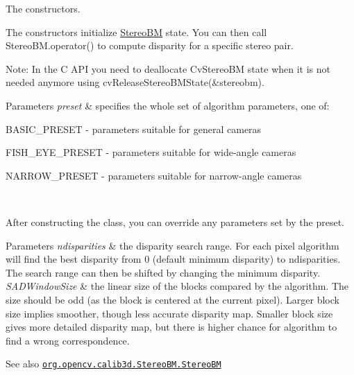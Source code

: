 The constructors.

The constructors initialize {\ttfamily \mbox{\hyperlink{classorg_1_1opencv_1_1calib3d_1_1_stereo_b_m}{Stereo\+BM}}} state. You can then call {\ttfamily Stereo\+B\+M.\+operator()} to compute disparity for a specific stereo pair.

Note\+: In the C A\+PI you need to deallocate {\ttfamily Cv\+Stereo\+BM} state when it is not needed anymore using {\ttfamily cv\+Release\+Stereo\+B\+M\+State(\&stereobm)}.


\begin{DoxyParams}{Parameters}
{\em preset} & specifies the whole set of algorithm parameters, one of\+: 
\begin{DoxyItemize}
\item B\+A\+S\+I\+C\+\_\+\+P\+R\+E\+S\+ET -\/ parameters suitable for general cameras 
\item F\+I\+S\+H\+\_\+\+E\+Y\+E\+\_\+\+P\+R\+E\+S\+ET -\/ parameters suitable for wide-\/angle cameras 
\item N\+A\+R\+R\+O\+W\+\_\+\+P\+R\+E\+S\+ET -\/ parameters suitable for narrow-\/angle cameras 
\end{DoxyItemize}\\
\hline
\end{DoxyParams}


After constructing the class, you can override any parameters set by the preset.


\begin{DoxyParams}{Parameters}
{\em ndisparities} & the disparity search range. For each pixel algorithm will find the best disparity from 0 (default minimum disparity) to {\ttfamily ndisparities}. The search range can then be shifted by changing the minimum disparity. \\
\hline
{\em S\+A\+D\+Window\+Size} & the linear size of the blocks compared by the algorithm. The size should be odd (as the block is centered at the current pixel). Larger block size implies smoother, though less accurate disparity map. Smaller block size gives more detailed disparity map, but there is higher chance for algorithm to find a wrong correspondence.\\
\hline
\end{DoxyParams}
\begin{DoxySeeAlso}{See also}
\href{http://docs.opencv.org/modules/calib3d/doc/camera_calibration_and_3d_reconstruction.html#stereobm-stereobm}{\tt org.\+opencv.\+calib3d.\+Stereo\+B\+M.\+Stereo\+BM} 
\end{DoxySeeAlso}
\mbox{\label{classorg_1_1opencv_1_1calib3d_1_1_stereo_b_m_a6720bd533e4f05bc35092c955882eb52}} 
